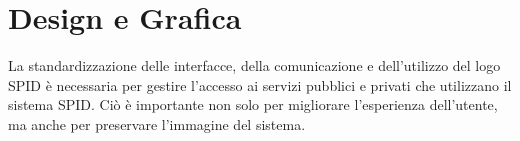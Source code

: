 \section{Design e Grafica}
La standardizzazione delle interfacce, della comunicazione e dell'utilizzo del logo SPID è necessaria per gestire l'accesso ai 
servizi pubblici e privati che utilizzano il sistema SPID. Ciò è importante non solo per migliorare l'esperienza dell'utente, 
ma anche per preservare l'immagine del sistema.
